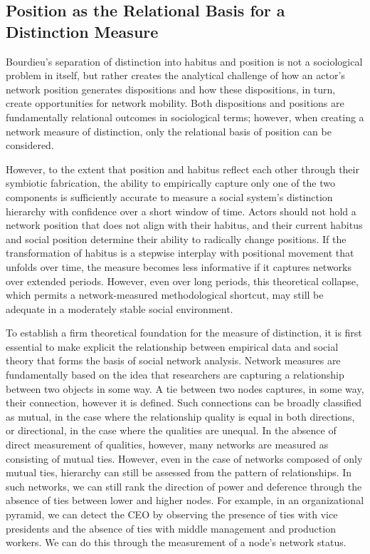 \documentclass[12pt]{article}
\begin{document}
\subsection{Position as the Relational Basis for a Distinction Measure}
Bourdieu's separation of distinction into habitus and position is not a sociological problem in itself, but rather creates the analytical challenge of how an actor's network position generates dispositions and how these dispositions, in turn, create opportunities for network mobility. Both dispositions and positions are fundamentally relational outcomes in sociological terms; however, when creating a network measure of distinction, only the relational basis of position can be considered. 

However, to the extent that position and habitus reflect each other through their symbiotic fabrication, the ability to empirically capture only one of the two components is sufficiently accurate to measure a social system's distinction hierarchy with confidence over a short window of time. Actors should not hold a network position that does not align with their habitus, and their current habitus and social position determine their ability to radically change positions. If the transformation of habitus is a stepwise interplay with positional movement that unfolds over time, the measure becomes less informative if it captures networks over extended periods. However, even over long periods, this theoretical collapse, which permits a network-measured methodological shortcut, may still be adequate in a moderately stable social environment. 

To establish a firm theoretical foundation for the measure of distinction, it is first essential to make explicit the relationship between empirical data and social theory that forms the basis of social network analysis. Network measures are fundamentally based on the idea that researchers are capturing a relationship between two objects in some way. A tie between two nodes captures, in some way, their connection, however it is defined. Such connections can be broadly classified as mutual, in the case where the relationship quality is equal in both directions, or directional, in the case where the qualities are unequal. In the absence of direct measurement of qualities, however, many networks are measured as consisting of mutual ties. However, even in the case of networks composed of only mutual ties, hierarchy can still be assessed from the pattern of relationships. In such networks, we can still rank the direction of power and deference through the absence of ties between lower and higher nodes. For example, in an organizational pyramid, we can detect the CEO by observing the presence of ties with vice presidents and the absence of ties with middle management and production workers. We can do this through the measurement of a node's network status. 
\end{document}
